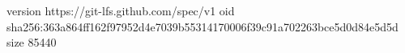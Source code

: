 version https://git-lfs.github.com/spec/v1
oid sha256:363a864ff162f97952d4e7039b55314170006f39c91a702263bce5d0d84e5d5d
size 85440
